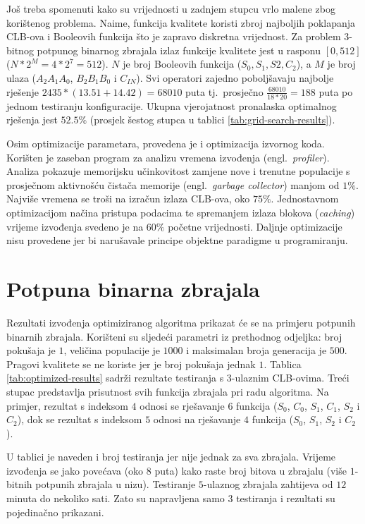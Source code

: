\documentclass[times, utf8, diplomski]{fer}
\begin{document}
Još treba spomenuti kako su vrijednosti u zadnjem stupcu vrlo malene zbog korištenog problema. Naime, funkcija kvalitete koristi zbroj najboljih poklapanja CLB-ova i Booleovih funkcija što je zapravo diskretna vrijednost. Za problem $3$-bitnog potpunog binarnog zbrajala izlaz funkcije kvalitete jest u rasponu $[0, 512]$ ($N*2^{M}=4*2^{7}=512$). $N$ je broj Booleovih funkcija ($S_{0}, S_{1}, S{2}, C_{2}$), a $M$ je broj ulaza ($A_{2}A_{1}A_{0}$, $B_{2}B_{1}B_{0}$ i $C_{IN}$). Svi operatori zajedno poboljšavaju najbolje rješenje $2435*(13.51+14.42)=68010$ puta tj.~prosječno $\frac{68010}{18*20}=188$ puta po jednom testiranju konfiguracije. Ukupna vjerojatnost pronalaska optimalnog rješenja jest $52.5\%$ (prosjek šestog stupca u tablici \ref{tab:grid-search-results}).

Osim optimizacije parametara, provedena je i optimizacija izvornog koda. Korišten je zaseban program za analizu vremena izvođenja (engl.~\textit{profiler}). Analiza pokazuje memorijsku učinkovitost zamjene nove i trenutne populacije s prosječnom aktivnošću čistača memorije (engl.~\textit{garbage collector}) manjom od $1\%$. Najviše vremena se troši na izračun izlaza CLB-ova, oko $75\%$. Jednostavnom optimizacijom načina pristupa podacima te spremanjem izlaza blokova (\textit{caching}) vrijeme izvođenja svedeno je na $60\%$ početne vrijednosti. Daljnje optimizacije nisu provedene jer bi narušavale principe objektne paradigme u programiranju.


\section{Potpuna binarna zbrajala}

Rezultati izvođenja optimiziranog algoritma prikazat će se na primjeru potpunih binarnih zbrajala. Korišteni su sljedeći parametri iz prethodnog odjeljka: broj pokušaja je $1$, veličina populacije je $1000$ i maksimalan broja generacija je $500$. Pragovi kvalitete se ne koriste jer je broj pokušaja jednak $1$. Tablica \ref{tab:optimized-results} sadrži rezultate testiranja s $3$-ulaznim CLB-ovima. Treći stupac predstavlja prisutnost svih funkcija zbrajala pri radu algoritma. Na primjer, rezultat s indeksom $4$ odnosi se rješavanje $6$ funkcija ($S_{0}$, $C_{0}$, $S_{1}$, $C_{1}$, $S_{2}$ i $C_{2}$), dok se rezultat s indeksom $5$ odnosi na rješavanje $4$ funkcija ($S_{0}$, $S_{1}$, $S_{2}$ i $C_{2}$).

U tablici je naveden i broj testiranja jer nije jednak za sva zbrajala. Vrijeme izvođenja se jako povećava (oko $8$ puta) kako raste broj bitova u zbrajalu (više $1$-bitnih potpunih zbrajala u nizu). Testiranje $5$-ulaznog zbrajala zahtijeva od $12$ minuta do nekoliko sati. Zato su napravljena samo $3$ testiranja i rezultati su pojedinačno prikazani.
\end{document}
